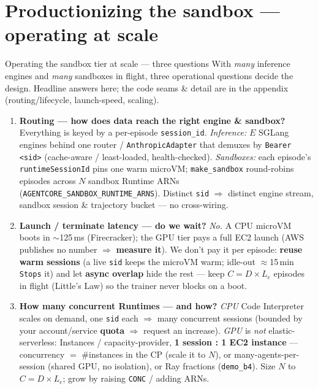 \documentclass[aspectratio=169]{beamer}
\begin{document}
\section{Productionizing the sandbox --- operating at scale}

\begin{frame}{Operating the sandbox tier at scale --- three questions}
  \footnotesize With \emph{many} inference engines and \emph{many} sandboxes in flight, three
  operational questions decide the design. Headline answers here; the code seams \& detail are in
  the appendix (routing/lifecycle, launch-speed, scaling).
  \vspace{0.2em}
  \begin{enumerate}\setlength\itemsep{0.5em}
    \item[\textbf{1}] \textbf{Routing --- how does data reach the right engine \& sandbox?}
      Everything is keyed by a per-episode \texttt{session\_id}. \emph{Inference:} $E$ SGLang engines
      behind one router / \texttt{AnthropicAdapter} that demuxes by \texttt{Bearer <sid>}
      (cache-aware / least-loaded, health-checked). \emph{Sandboxes:} each episode's
      \texttt{runtimeSessionId} pins one warm microVM; \texttt{make\_sandbox} round-robins episodes
      across $N$ sandbox Runtime ARNs (\texttt{AGENTCORE\_SANDBOX\_RUNTIME\_ARNS}). Distinct \texttt{sid}
      $\Rightarrow$ distinct engine stream, sandbox session \& trajectory bucket --- no cross-wiring.
    \item[\textbf{2}] \textbf{Launch / terminate latency --- do we wait?} \emph{No.} A CPU microVM
      boots in $\sim$125\,ms (Firecracker); the GPU tier pays a full EC2 launch (AWS publishes no
      number $\Rightarrow$ \textbf{measure it}). We don't pay it per episode: \textbf{reuse warm
      sessions} (a live \texttt{sid} keeps the microVM warm; idle-out $\approx$15\,min \texttt{Stops}
      it) and let \textbf{async overlap} hide the rest --- keep $C = D \times L_e$ episodes in flight
      (Little's Law) so the trainer never blocks on a boot.
    \item[\textbf{3}] \textbf{How many concurrent Runtimes --- and how?} \emph{CPU} Code Interpreter
      scales on demand, one \texttt{sid} each $\Rightarrow$ many concurrent sessions (bounded by your
      account/service \textbf{quota} $\Rightarrow$ request an increase). \emph{GPU} is \emph{not}
      elastic-serverless: Instances / capacity-provider, \textbf{1 session : 1 EC2 instance} ---
      concurrency $=$ \#instances in the CP (scale it to $N$), or many-agents-per-session (shared GPU,
      no isolation), or Ray fractions (\texttt{demo\_b4}). Size $N$ to $C = D \times L_e$; grow by
      raising \texttt{CONC} / adding ARNs.
  \end{enumerate}
\end{frame}
\end{document}
